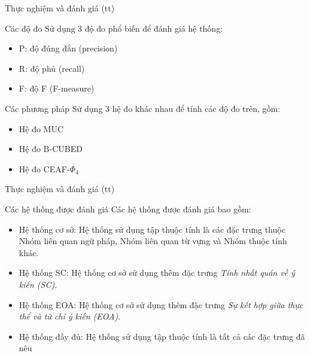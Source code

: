 \documentclass{beamer}
\begin{document}
		\begin{frame}{Thực nghiệm và đánh giá (tt)}			
			\begin{block}{Các độ đo}
				Sử dụng 3 độ đo phổ biến để đánh giá hệ thống: 
				\begin{itemize}
					\item{P: độ đúng đắn (precision)}
					\item{R: độ phủ (recall)}
					\item{F: độ F (F-measure)}
				\end{itemize}		
			\end{block}
			\begin{block}{Các phương pháp}
				Sử dụng 3 hệ đo khác nhau để tính các độ đo trên, gồm:
				\begin{itemize}
					\item{Hệ đo MUC}
					\item{Hệ đo B-CUBED}
					\item{Hệ đo CEAF-$\Phi_4$}
				\end{itemize}
			\end{block}
		\end{frame}

		\begin{frame}{Thực nghiệm và đánh giá (tt)}			
			\begin{block}{Các hệ thống được đánh giá}
				Các hệ thống được đánh giá bao gồm:
				\begin{itemize}
					\item{Hệ thống cơ sở: Hệ thống sử dụng tập thuộc tính là các đặc trưng thuộc Nhóm liên quan ngữ pháp, Nhóm liên quan từ vựng và Nhóm thuộc tính khác}.
					\item{Hệ thống SC: Hệ thống cơ sở sử dụng thêm đặc trưng \textit{Tính nhất quán về ý kiến (SC)}}.
					\item{Hệ thống EOA: Hệ thống cơ sở sử dụng thêm đặc trưng \textit{Sự kết hợp giữa thực thể và từ chỉ ý kiến (EOA)}}.
					\item{Hệ thống đầy đủ: Hệ thống sử dụng tập thuộc tính là tất cả các đặc trưng đã nêu}
				\end{itemize}
			\end{block}			
		\end{frame}
\end{document}
